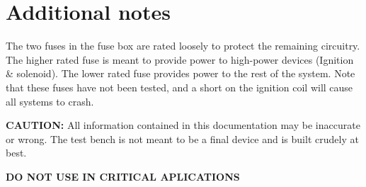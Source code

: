 \documentclass[12pt,article]{memoir}
\begin{document}
\section{Additional notes}
The two fuses in the fuse box are rated loosely to protect the remaining circuitry. The higher rated fuse is meant to provide power to high-power devices (Ignition \& solenoid). The lower rated fuse provides power to the rest of the system.
Note that these fuses have not been tested, and a short on the ignition coil will cause all systems to crash.

\textbf{CAUTION:} All information contained in this documentation may be inaccurate or wrong. The test bench is not meant to be a final device and is built crudely at best.

\textbf{DO NOT USE IN CRITICAL APLICATIONS}

\end{document}
